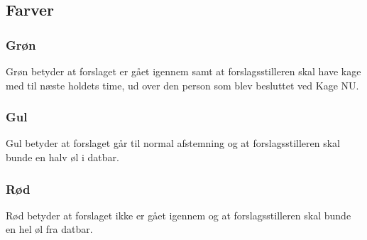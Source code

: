\documentclass{article}
\begin{document}
	\subsection{Farver}
	\subsubsection{Grøn}
	Grøn betyder at forslaget er gået igennem samt at forslagsstilleren skal have kage med til næste holdets time, ud over den person som blev besluttet ved Kage NU. 
	\subsubsection{Gul}
	Gul betyder at forslaget går til normal afstemning og at forslagsstilleren skal bunde en halv øl i datbar. 
	\subsubsection{Rød}
	Rød betyder at forslaget ikke er gået igennem og at forslagsstilleren skal bunde en hel øl fra datbar.
	
	
	\vfill
	\doclicenseThis
\end{document}

